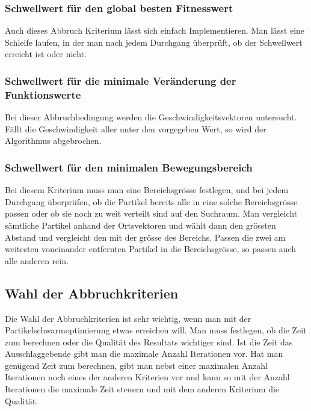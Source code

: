 \subsubsection{Schwellwert für den global besten Fitnesswert}
Auch dieses Abbruch Kriterium lässt sich einfach Implementieren. Man lässt eine Schleife laufen, in der man nach jedem Durchgang überprüft, ob der Schwellwert erreicht ist oder nicht. 

\subsubsection{Schwellwert für die minimale Veränderung der Funktionswerte}
Bei dieser Abbruchbedingung werden die Geschwindigkeitsvektoren untersucht. Fällt die Geschwindigkeit aller unter den vorgegeben Wert, so wird der Algorithmus abgebrochen. 

\subsubsection{Schwellwert für den minimalen Bewegungsbereich}
Bei diesem Kriterium muss man eine Bereichsgrösse festlegen, und bei jedem Durchgang überprüfen, ob die Partikel bereits alle in eine solche Bereichsgrösse passen oder ob sie noch zu weit verteilt sind auf den Suchraum. Man vergleicht sämtliche Partikel anhand der Ortsvektoren und wählt dann den grössten Abstand und vergleicht den mit der grösse des Bereichs. Passen die zwei am weitesten voneinander entfernten Partikel in die Bereichsgrösse, so passen auch alle anderen rein.

\subsection{Wahl der Abbruchkriterien}
Die Wahl der Abbruchkriterien ist sehr wichtig, wenn man mit der Partikelschwarmoptimierung etwas erreichen will. Man muss festlegen, ob die Zeit zum berechnen oder die Qualität des Resultats wichtiger sind. Ist die Zeit das Ausschlaggebende gibt man die maximale Anzahl Iterationen vor. Hat man genügend Zeit zum berechnen, gibt man nebst einer maximalen Anzahl Iterationen noch eines der anderen Kriterien vor und kann so mit der Anzahl Iterationen die maximale Zeit steuern und mit dem anderen Kriterium die Qualität. 

